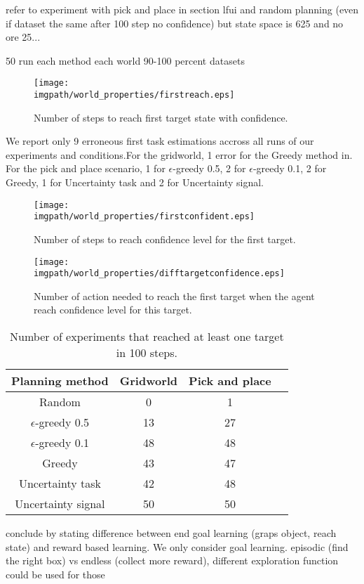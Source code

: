 
refer to experiment with pick and place in section lfui and random planning (even if dataset the same after 100 step no confidence) but state space is 625 and no ore 25...


50 run each method each world
90-100 percent datasets

\begin{figure}[!ht]
\centering
\texttt{[image: \\imgpath/world\_properties/firstreach.eps]}
\caption{Number of steps to reach first target state with confidence.}
\label{fig:wordlpropertiestimefirst}
\end{figure}

We report only 9 erroneous first task estimations accross all runs of our experiments and conditions.For the gridworld, 1 error for the Greedy method in. For the pick and place scenario, 1 for $\epsilon$-greedy 0.5, 2 for $\epsilon$-greedy 0.1, 2 for Greedy, 1 for Uncertainty task and 2 for Uncertainty signal.

\begin{figure}[!ht]
\centering
\texttt{[image: \\imgpath/world\_properties/firstconfident.eps]}
\caption{Number of steps to reach confidence level for the first target.}
\label{fig:wordlpropertiesconfidencefirst}
\end{figure} 

\begin{figure}[!ht]
\centering
\texttt{[image: \\imgpath/world\_properties/difftargetconfidence.eps]}
\caption{Number of action needed to reach the first target when the agent reach confidence level for this target.}
\label{fig:wordlpropertiestargetdist}
\end{figure} 


\begin{table}[!ht]
\centering
{}
\begin{tabular}{c c c c}
    Planning method & Gridworld &  Pick and place \\ \hline
    Random & 0 & 1 \\ 
    $\epsilon$-greedy 0.5 & 13 & 27 \\
    $\epsilon$-greedy 0.1 & 48 & 48 \\
    Greedy & 43 & 47 \\
    Uncertainty task & 42 & 48 \\
    Uncertainty signal & 50 & 50 \\
\end{tabular}
\caption{Number of experiments that reached at least one target in 100 steps.}
\label{tab:}
\end{table}


conclude by stating difference between end goal learning (graps object, reach state) and reward based learning. We only consider goal learning. episodic (find the right box) vs endless (collect more reward), different exploration function could be used for those

